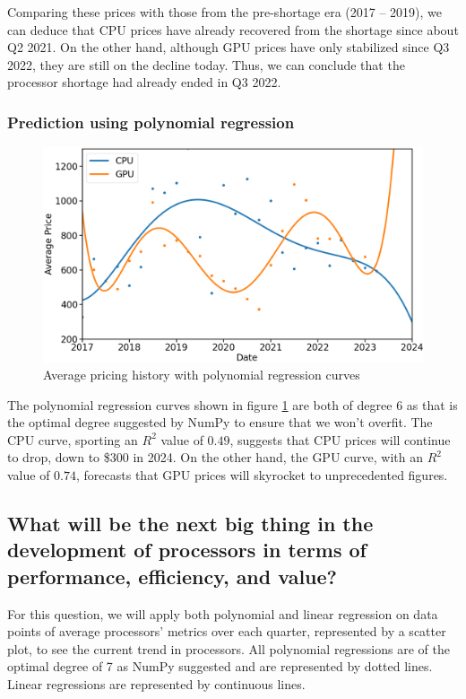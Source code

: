 \documentclass[conference]{IEEEtran}
\begin{document}
Comparing these prices with those from the pre-shortage era (2017 -- 2019), we
can deduce that CPU prices have already recovered from the shortage since
about Q2 2021. On the other hand, although GPU prices have only stabilized
since Q3 2022, they are still on the decline today. Thus, we can conclude that
the processor shortage had already ended in Q3 2022.

\subsubsection{Prediction using polynomial regression}
\begin{figure}[htbp]
	\centerline{\includegraphics[width=\columnwidth]{avg_price_reg.png}}
	\caption{Average pricing history with polynomial regression curves}
	\label{fig4}
\end{figure}
The polynomial regression curves shown in figure \ref{fig4} are both of degree
6 as that is the optimal degree suggested by NumPy to ensure that we won't
overfit. The CPU curve, sporting an $R^{2}$ value of $0.49$, suggests that
CPU prices will continue to drop, down to \$300 in 2024. On the other hand,
the GPU curve, with an $R^{2}$ value of $0.74$, forecasts that GPU prices will
skyrocket to unprecedented figures.

\subsection{What will be the next big thing in the development of
	processors in terms of performance, efficiency, and value?}

For this question, we will apply both polynomial and linear regression on
data points of average processors’ metrics over each quarter, represented by a
scatter plot, to see the current trend in processors. All polynomial
regressions are of the optimal degree of 7 as NumPy suggested and are
represented by dotted lines. Linear regressions are represented by continuous
lines.
\end{document}
